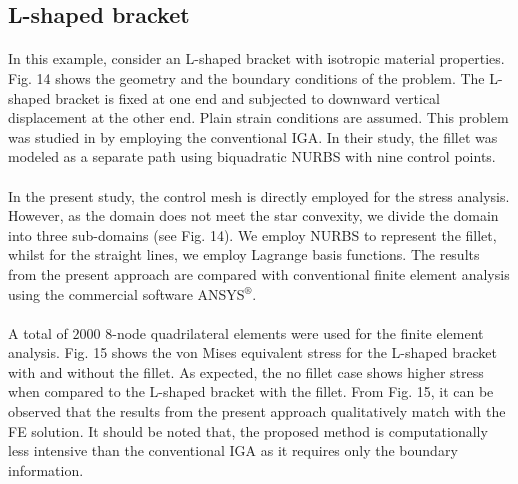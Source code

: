 \subsection{L-shaped bracket}
\label{subsection:l_shaped_bracket}
\paragraph{}
In this example, consider an L-shaped bracket with isotropic material properties.
Fig. 14 shows the geometry and the boundary conditions of the problem.
The L-shaped bracket is fixed at one end and subjected to downward vertical displacement at the other end.
Plain strain conditions are assumed.
This problem was studied in \cite{LIPTON2010357} by employing the conventional IGA.
In their study, the fillet was modeled as a separate path using biquadratic NURBS with nine control points.
\paragraph{}
In the present study, the control mesh is directly employed for the stress analysis.
However, as the domain does not meet the star convexity, we divide the domain into three sub-domains 
    (see Fig. 14).
We employ NURBS to represent the fillet, whilst for the straight lines, we employ Lagrange basis functions.
The results from the present approach are compared with conventional finite element analysis using the commercial
    software ANSYS$^\circledR$.
\paragraph{}
A total of $2000$ $8$-node quadrilateral elements were used for the finite element analysis.
Fig. 15 shows the von Mises equivalent stress for the L-shaped bracket with and without the fillet.
As expected, the no fillet case shows higher stress when compared to the L-shaped bracket with the fillet.
From Fig. 15, it can be observed that the results from the present approach qualitatively match with the FE solution.
It should be noted that, the proposed method is computationally less intensive than the conventional IGA as it requires
    only the boundary information.



\pagebreak